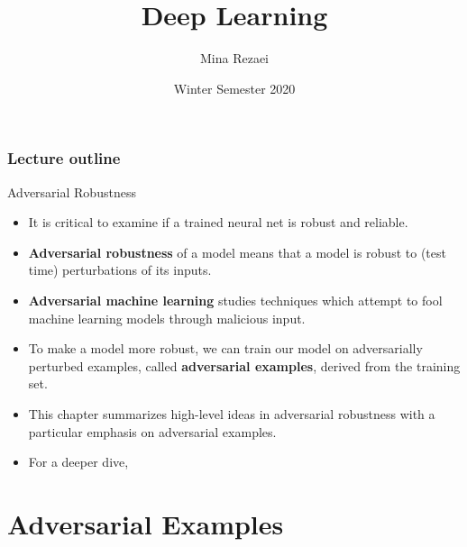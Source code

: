 \documentclass[11pt,compress,t,notes=noshow]{beamer}
\title{Deep Learning}
\author{Mina Rezaei}
\institute{Department of Statistics -- LMU Munich}
\date{Winter Semester 2020}
\begin{document}








\newcommand{\Dsubtrain}{\mathcal{D}_{\text{subtrain}}}
\newcommand{\Dval}{\mathcal{D}_{\text{val}}}



\begin{frame}
\frametitle{Lecture outline}
\tableofcontents
\end{frame}


\begin{frame}{Adversarial Robustness}
    \begin{itemize}
        \item It is critical to examine if a trained neural net is robust and reliable. 
        \item \textbf{Adversarial robustness} of a model means that a model is robust to (test time) perturbations of its inputs. 
        \item \textbf{Adversarial machine learning} studies techniques which attempt  to fool machine learning models through malicious input.
        \item To make a model more robust, we can train our model on adversarially perturbed examples, called \textbf{adversarial examples}, derived from the training set.  
        \item This chapter summarizes  high-level ideas in adversarial robustness with a particular emphasis on adversarial examples.
        \item For a deeper dive, \href{https://adversarial-ml-tutorial.org/}{}
    \end{itemize}
\end{frame}


\section{Adversarial Examples}
\end{document}
